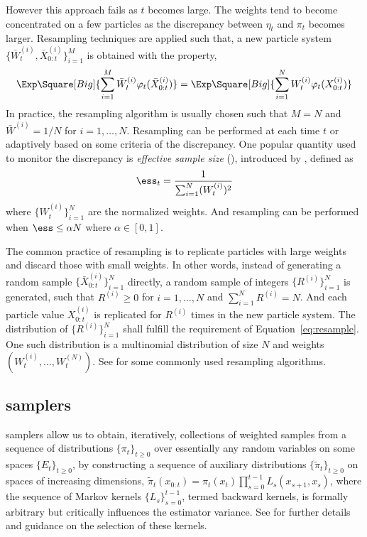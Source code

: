 \documentclass[11pt,bib,mint,hyper,altcolor]{marticle}
\begin{document}
However this approach fails as $t$ becomes large. The weights tend to become
concentrated on a few particles as the discrepancy between $\eta_t$ and $\pi_t$
becomes larger. Resampling techniques are applied such that, a new particle
system $\{\bar{W}_t^{(i)},\bar{X}_{0:t}^{(i)}\}_{i=1}^M$ is obtained with the
property,
\begin{equation}
  \Exp\Square[Big]{\sum_{i=1}^M\bar{W}_t^{(i)}\varphi_t(\bar{X}_{0:t}^{(i)})} =
  \Exp\Square[Big]{\sum_{i=1}^NW_t^{(i)}\varphi_t(X_{0:t}^{(i)})}
  \label{eq:resample}
\end{equation}
In practice, the resampling algorithm is usually chosen such that $M = N$ and
$\bar{W}^{(i)} = 1/N$ for $i=1,\dots,N$. Resampling can be performed at each
time $t$ or adaptively based on some criteria of the discrepancy. One popular
quantity used to monitor the discrepancy is \emph{effective sample size}
(\ess), introduced by \textcite{Liu:1998iu}, defined as
\begin{equation}
  \ess_t = \frac{1}{\sum_{i=1}^N (W_t^{(i)})^2}
\end{equation}
where $\{W_t^{(i)}\}_{i=1}^N$ are the normalized weights. And resampling can be
performed when $\ess\le \alpha N$ where $\alpha\in[0,1]$.

The common practice of resampling is to replicate particles with large weights
and discard those with small weights. In other words, instead of generating a
random sample $\{\bar{X}_{0:t}^{(i)}\}_{i=1}^N$ directly, a random sample of
integers $\{R^{(i)}\}_{i=1}^N$ is generated, such that $R^{(i)} \ge 0$ for $i =
1,\dots,N$ and $\sum_{i=1}^N R^{(i)} = N$. And each particle value
$X_{0:t}^{(i)}$ is replicated for $R^{(i)}$ times in the new particle system.
The distribution of $\{R^{(i)}\}_{i=1}^N$ shall fulfill the requirement of
Equation~\eqref{eq:resample}. One such distribution is a multinomial
distribution of size $N$ and weights $(W_t^{(i)},\dots,W_t^{(N)})$. See
\textcite{Douc:2005wa} for some commonly used resampling algorithms.

\subsection{\protect\smc samplers}
\label{sub:SMC Samplers}

\smc samplers allow us to obtain, iteratively, collections of weighted samples
from a sequence of distributions $\{\pi_t\}_{t\ge0}$ over essentially any
random variables on some spaces $\{E_t\}_{t\ge0}$, by constructing a sequence
of auxiliary distributions $\{\tilde\pi_t\}_{t\ge0}$ on spaces of increasing
dimensions, $\tilde\pi_t(x_{0:t})=\pi_t (x_t) \prod_{s=0}^{t-1}
L_s(x_{s+1},x_s)$, where the sequence of Markov kernels $\{L_s\}_{s=0}^{t-1}$,
termed backward kernels, is formally arbitrary but critically influences the
estimator variance. See \textcite{DelMoral:2006hc} for further details and
guidance on the selection of these kernels.
\end{document}
